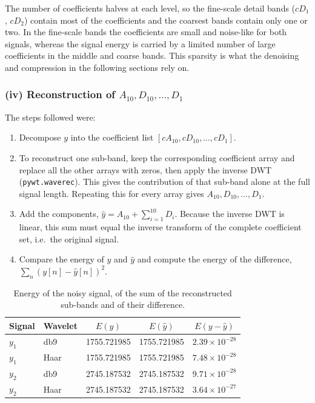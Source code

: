\documentclass[11pt,a4paper]{article}
\begin{document}
The number of coefficients halves at each level, so the fine-scale detail bands ($cD_1$, $cD_2$) contain most of the coefficients and the coarsest bands contain only one or two. In the fine-scale bands the coefficients are small and noise-like for both signals, whereas the signal energy is carried by a limited number of large coefficients in the middle and coarse bands. This sparsity is what the denoising and compression in the following sections rely on.

\subsubsection*{(iv) Reconstruction of $A_{10}, D_{10}, \dots, D_1$}

The steps followed were:
\begin{enumerate}[leftmargin=*]
    \item Decompose $y$ into the coefficient list $[cA_{10}, cD_{10}, \dots, cD_1]$.
    \item To reconstruct one sub-band, keep the corresponding coefficient array and replace all the other arrays with zeros, then apply the inverse DWT (\texttt{pywt.waverec}). This gives the contribution of that sub-band alone at the full signal length. Repeating this for every array gives $A_{10}, D_{10}, \dots, D_1$.
    \item Add the components, $\hat{y} = A_{10} + \sum_{i=1}^{10} D_i$. Because the inverse DWT is linear, this sum must equal the inverse transform of the complete coefficient set, i.e.\ the original signal.
    \item Compare the energy of $y$ and $\hat{y}$ and compute the energy of the difference, $\sum_n (y[n] - \hat{y}[n])^2$.
\end{enumerate}

\begin{table}[H]
    \centering
    \begin{tabular}{llccc}
        \toprule
        Signal & Wavelet & $E(y)$ & $E(\hat{y})$ & $E(y - \hat{y})$ \\
        \midrule
        $y_1$ & db9  & 1755.721985 & 1755.721985 & $2.39\times10^{-28}$ \\
        $y_1$ & Haar & 1755.721985 & 1755.721985 & $7.48\times10^{-28}$ \\
        $y_2$ & db9  & 2745.187532 & 2745.187532 & $9.71\times10^{-28}$ \\
        $y_2$ & Haar & 2745.187532 & 2745.187532 & $3.64\times10^{-27}$ \\
        \bottomrule
    \end{tabular}
    \caption{Energy of the noisy signal, of the sum of the reconstructed sub-bands and of their difference.}
    \label{tab:energy}
\end{table}
\end{document}
